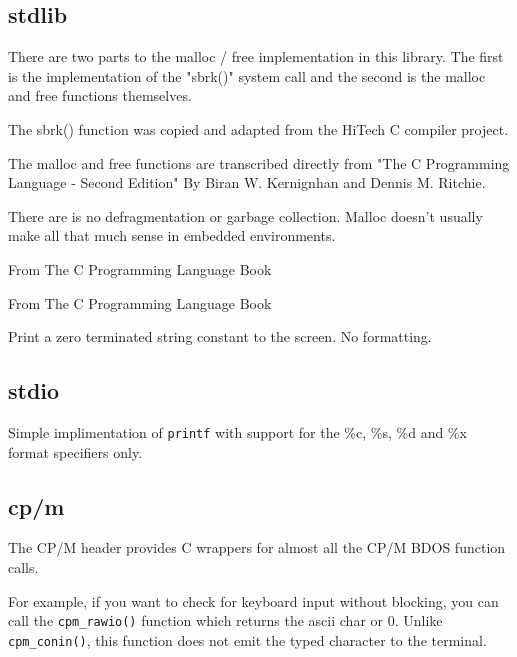\documentclass[10pt,a4paper,hidelinks]{article}
\begin{document}
\subsection{stdlib}

There are two parts to the malloc / free implementation in this library.  The
first is the implementation of the "sbrk()" system call and the second is the
malloc and free functions themselves.

The sbrk() function was copied and adapted from the HiTech C compiler project.

The malloc and free functions are transcribed directly from "The C Programming
Language - Second Edition" By Biran W. Kernignhan and Dennis M. Ritchie.

There are is no defragmentation or garbage collection.  Malloc doesn't usually
make all that much sense in embedded environments.

\begin{description}[font=$\bullet$~\normalfont\scshape\color{red!50!black}]
  \item[abs]
  \item[exit]
  \item[free] From The C Programming Language Book
  \item[itoa]
  \item[malloc] From The C Programming Language Book
  \item[puts] Print a zero terminated string constant to the screen.  No
    formatting.
\end{description}

\subsection{stdio}

\begin{description}[font=$\bullet$~\normalfont\scshape\color{red!50!black}]
  \item[printf] Simple implimentation of \texttt{printf} with support for the
    \%c, \%s, \%d and \%x format specifiers only.
\end{description}

\subsection{cp/m}
The CP/M header provides C wrappers for almost all the CP/M BDOS function calls.

For example, if you want to check for keyboard input without blocking, you can
call the \texttt{cpm\_rawio()} function which returns the ascii char or 0.
Unlike \texttt{cpm\_conin()}, this function does not emit the typed character to
the terminal.
\end{document}
